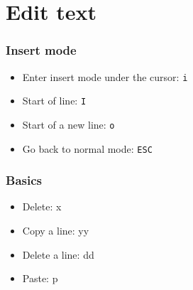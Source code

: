 \documentclass{beamer}
\begin{document}
\section{Edit text}
\begin{frame} \frametitle{Insert mode}
  \begin{itemize}
    \item Enter insert mode under the cursor: {\tt i}
    \item Start of line: {\tt I}
    \item Start of a new line: {\tt o}
    \item Go back to normal mode: {\tt ESC}
  \end{itemize}
\end{frame}
\begin{frame} \frametitle{Basics}
  \begin{itemize}
    \item Delete: x
    \item Copy a line: yy
    \item Delete a line: dd
    \item Paste: p
  \end{itemize}
\end{frame}
\end{document}
